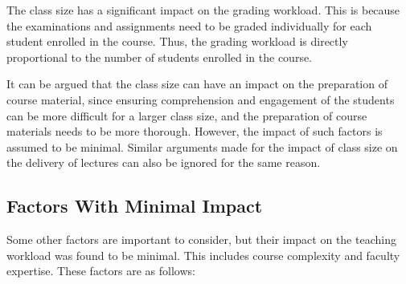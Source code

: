 The class size has a significant impact on the grading workload. This is because the examinations and assignments need to be graded individually for each student enrolled in the course. Thus, the grading workload is directly proportional to the number of students enrolled in the course.

It can be argued that the class size can have an impact on the preparation of course material, since ensuring comprehension and engagement of the students can be more difficult for a larger class size, and the preparation of course materials needs to be more thorough. However, the impact of such factors is assumed to be minimal. Similar arguments made for the impact of class size on the delivery of lectures can also be ignored for the same reason.


\subsection{Factors With Minimal Impact}

Some other factors are important to consider, but their impact on the teaching workload was found to be minimal. This includes course complexity and faculty expertise. These factors are as follows:

